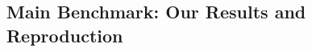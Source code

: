 \documentclass[main.tex]{subfiles}
\begin{document}
\subsection{Main Benchmark: Our Results and Reproduction}





\end{document}
